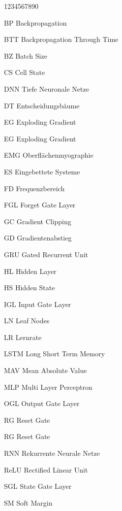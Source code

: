 %
%

\begin{labeling}{1234567890}
        \item[BP] Backpropagation 
        \item[BTT] Backpropagation Through Time
        \item[BZ] Batch Size
        \item[CS] Cell State
        \item[DNN] Tiefe Neuronale Netze
        \item[DT] Entscheidungsbäume
        \item[EG] Exploding Gradient
        \item[EG] Exploding Gradient        
        \item[EMG] Oberflächenmyographie 
        \item[ES] Eingebettete Systeme
        \item[FD] Frequenzbereich 
        \item[FGL] Forget Gate Layer
        \item[GC] Gradient Clipping
        \item[GD] Gradientenabstieg
        \item[GRU] Gated Recurrent Unit
        \item[HL] Hidden Layer
        \item[HS] Hidden State 
        \item[IGL] Input Gate Layer
        \item[LN] Leaf Nodes
        \item[LR] Lernrate
        \item[LSTM] Long Short Term Memory
        \item[MAV] Mean Absolute Value
        \item[MLP] Multi Layer Perceptron
        \item[OGL] Output Gate Layer
        \item[RG] Reset Gate
        \item[RG] Reset Gate  
        \item[RNN] Rekurrente Neurale Netze
        \item[ReLU] Rectified Linear Unit
        \item[SGL] State Gate Layer
        \item[SM] Soft Margin                              

\end{labeling}
